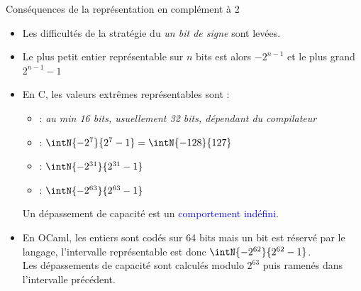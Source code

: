\documentclass[10pt]{beamer}
\begin{document}
\begin{frame}{\Ctitle}{\stitle}
	\begin{block}{Conséquences de la représentation en complément à 2}
		\begin{itemize}
			\item<1-> Les difficultés de la stratégie du \textit{un bit de signe} sont levées.
			\item<2-> Le plus petit entier représentable sur $n$ bits est alors $-2^{n-1}$ et le plus grand $2^{n-1}-1$
			\item<3-> En C, les valeurs extrêmes représentables sont :
				\begin{itemize}
					\item<4->  : \textit{au min 16 bits, usuellement 32 bits, dépendant du compilateur}
					\item<5->  : $\intN{-2^7}{2^7-1} = \intN{-128}{127}$
					\item<6->   : $\intN{-2^{31}}{2^{31}-1}$
					\item<7->   : $\intN{-2^{63}}{2^{63}-1}$
				\end{itemize}
				 \textcolor{red}{\danger} Un dépassement de capacité est un \textcolor{blue}{comportement indéfini}.
			\item<9-> En OCaml, les entiers sont codés sur 64 bits mais un bit est réservé par le langage, l'intervalle représentable est donc $\intN{-2^{62}}{2^{62}-1}$.\\
				\onslide<10-> Les dépassements de capacité sont calculés modulo  $2^{63}$ puis ramenés dans l'intervalle précédent.
		\end{itemize}
	\end{block}
\end{frame}
\end{document}

